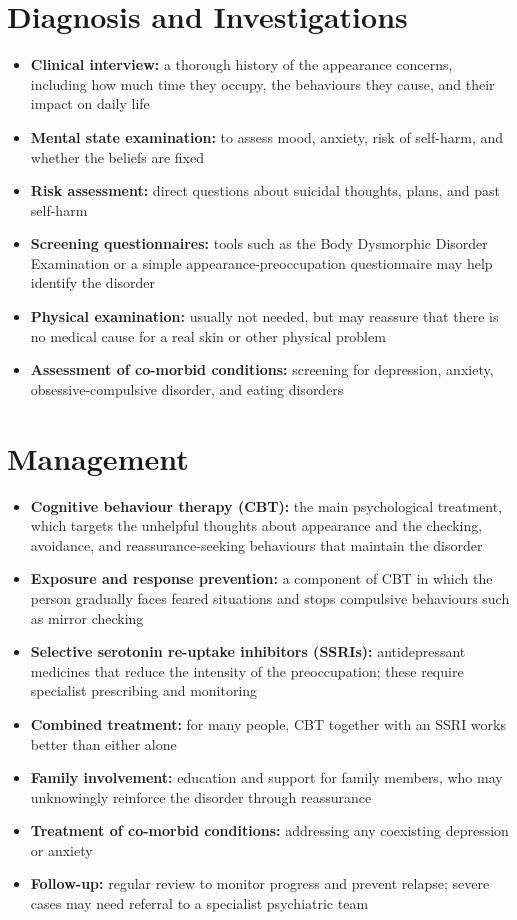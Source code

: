 \section*{Diagnosis and Investigations}
\begin{itemize}
    \item \textbf{Clinical interview:} a thorough history of the appearance concerns, including how much time they occupy, the behaviours they cause, and their impact on daily life
    \item \textbf{Mental state examination:} to assess mood, anxiety, risk of self-harm, and whether the beliefs are fixed
    \item \textbf{Risk assessment:} direct questions about suicidal thoughts, plans, and past self-harm
    \item \textbf{Screening questionnaires:} tools such as the Body Dysmorphic Disorder Examination or a simple appearance-preoccupation questionnaire may help identify the disorder
    \item \textbf{Physical examination:} usually not needed, but may reassure that there is no medical cause for a real skin or other physical problem
    \item \textbf{Assessment of co-morbid conditions:} screening for depression, anxiety, obsessive-compulsive disorder, and eating disorders
\end{itemize}

\section*{Management}
\begin{itemize}
    \item \textbf{Cognitive behaviour therapy (CBT):} the main psychological treatment, which targets the unhelpful thoughts about appearance and the checking, avoidance, and reassurance-seeking behaviours that maintain the disorder
    \item \textbf{Exposure and response prevention:} a component of CBT in which the person gradually faces feared situations and stops compulsive behaviours such as mirror checking
    \item \textbf{Selective serotonin re-uptake inhibitors (SSRIs):} antidepressant medicines that reduce the intensity of the preoccupation; these require specialist prescribing and monitoring
    \item \textbf{Combined treatment:} for many people, CBT together with an SSRI works better than either alone
    \item \textbf{Family involvement:} education and support for family members, who may unknowingly reinforce the disorder through reassurance
    \item \textbf{Treatment of co-morbid conditions:} addressing any coexisting depression or anxiety
    \item \textbf{Follow-up:} regular review to monitor progress and prevent relapse; severe cases may need referral to a specialist psychiatric team
\end{itemize}


